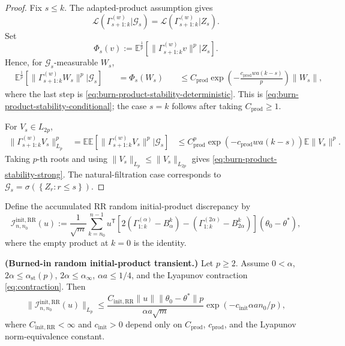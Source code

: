 \begin{proof} Fix $s \le k$. The adapted-product assumption gives
\[
\mathcal{L} \left( \Gamma_{s + 1:k}^{(w)} | \mathcal{G}_{s} \right)
  = \mathcal{L} \left( \Gamma_{s + 1:k}^{(w)} | Z_{s} \right).
\]
Set
\[
\Phi_{s}(v)
  := \mathbb{E}^{\frac{1}{p}} \left[ \lVert \Gamma_{s + 1:k}^{(w)} v \rVert^{p} | Z_{s} \right].
\]
Hence, for $\mathcal{G}_{s}$-measurable $W_{s}$,
\[
\begin{aligned}
&\mathbb{E}^{\frac{1}{p}} \left[ \lVert \Gamma_{s + 1:k}^{(w)} W_{s} \rVert^{p} | \mathcal{G}_{s} \right]
&\quad = \Phi_{s}(W_{s})
&\quad \le C_{\mathrm{prod}} \exp\left(- \frac{c_{\mathrm{prod}} w a (k - s)}{p}\right) \lVert W_{s} \rVert,
\end{aligned}
\]
where the last step is \eqref{eq:burn-product-stability-deterministic}. This is
\eqref{eq:burn-product-stability-conditional}; the case $s = k$ follows after taking
$C_{\mathrm{prod}} \ge 1$.

For $V_{s} \in L_{2p}$,
\[
\begin{aligned}
\lVert \Gamma_{s + 1:k}^{(w)} V_{s} \rVert_{L_{p}}^{p}
  &= \mathbb{E} \mathbb{E} \left[ \lVert \Gamma_{s + 1:k}^{(w)} V_{s} \rVert^{p} | \mathcal{G}_{s} \right]
  &\le C_{\mathrm{prod}}^{p} \exp\left(-c_{\mathrm{prod}} w a (k - s)\right)
      \mathbb{E}\lVert V_{s} \rVert^{p}.
\end{aligned}
\]
Taking $p$-th roots and using $\lVert V_{s} \rVert_{L_{p}} \le \lVert V_{s} \rVert_{L_{2p}}$ gives
\eqref{eq:burn-product-stability-strong}. The natural-filtration case corresponds to
$\mathcal{G}_{s} = \sigma(\left\{ Z_{r} : r \le s \right\})$.
\end{proof}

Define the accumulated RR random initial-product discrepancy by
\begin{equation}
\mathcal{I}_{n,n_{0}}^{\mathrm{init,RR}}(u)
  := \frac{1}{\sqrt{m}} \sum_{k = n_{0}}^{n - 1}
      u^{\mathsf{T}} \left[ 2 \left( \Gamma_{1:k}^{(\alpha)} - B_{\alpha}^{k} \right)
        - \left( \Gamma_{1:k}^{(2 \alpha)} - B_{2 \alpha}^{k} \right) \right] (\theta_{0} - \theta^{*}),
\label{eq:burn-random-init-discrepancy}
\end{equation}
where the empty product at $k = 0$ is the identity.

\begin{lemma}\label{lem:burn-random-initial-product}
  \textbf{(Burned-in random initial-product transient.)}
  Let $p \ge 2$. Assume $0 < \alpha$, $2 \alpha \le \alpha_{\mathrm{st}}(p)$,
  $2 \alpha \le \alpha_{\infty}$, $\alpha a \le 1 / 4$, and the Lyapunov
  contraction \eqref{eq:contraction}. Then
  \begin{equation}
\lVert \mathcal{I}_{n,n_{0}}^{\mathrm{init,RR}}(u) \rVert_{L_{p}}
    \le \frac{C_{\mathrm{init,RR}} \lVert u \rVert \lVert \theta_{0} - \theta^{*} \rVert p}{\alpha a \sqrt{m}}
       \exp\left(-c_{\mathrm{init}} \alpha a n_{0} / p\right),
\label{eq:burn-random-init-bound}
\end{equation}
  where $C_{\mathrm{init,RR}} < \infty$ and $c_{\mathrm{init}} > 0$ depend only on
  $C_{\mathrm{prod}}$, $c_{\mathrm{prod}}$, and the Lyapunov norm-equivalence constant.
\end{lemma}

